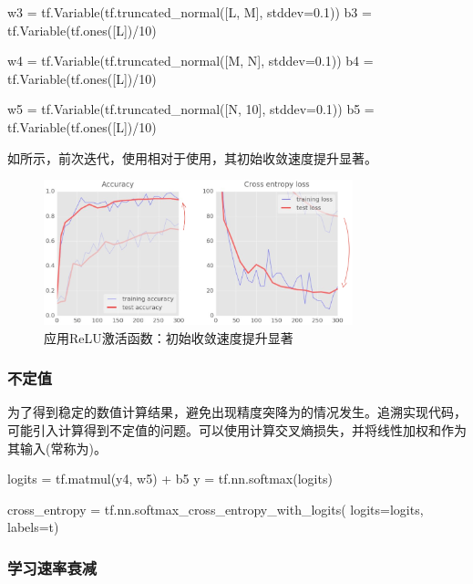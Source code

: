 \begin{content}
\begin{content}
\begin{leftbar}
\begin{python}
w3 = tf.Variable(tf.truncated_normal([L, M], stddev=0.1)) 
b3 = tf.Variable(tf.ones([L])/10)

w4 = tf.Variable(tf.truncated_normal([M, N], stddev=0.1)) 
b4 = tf.Variable(tf.ones([L])/10)

w5 = tf.Variable(tf.truncated_normal([N, 10], stddev=0.1)) 
b5 = tf.Variable(tf.ones([L])/10)
\end{python}
\end{leftbar}

如所示，前次迭代，使用相对于使用，其初始收敛速度提升显著。

\begin{figure}[H]
\centering
\includegraphics[width=0.8\textwidth]{figures/mnist-sigmoid-to-relu.png}
\caption{应用ReLU激活函数：初始收敛速度提升显著}
 \label{fig:mnist-sigmoid-to-relu}
\end{figure}

\subsubsection{不定值}

为了得到稳定的数值计算结果，避免出现精度突降为的情况发生。追溯实现代码，可能引入计算得到不定值的问题。可以使用计算交叉熵损失，并将线性加权和作为其输入(常称为)。

\begin{leftbar}
\begin{python}
logits = tf.matmul(y4, w5) + b5
y = tf.nn.softmax(logits)

cross_entropy = tf.nn.softmax_cross_entropy_with_logits(
  logits=logits, labels=t)
\end{python}
\end{leftbar}

\subsubsection{学习速率衰减}


\end{content}
\end{content}
